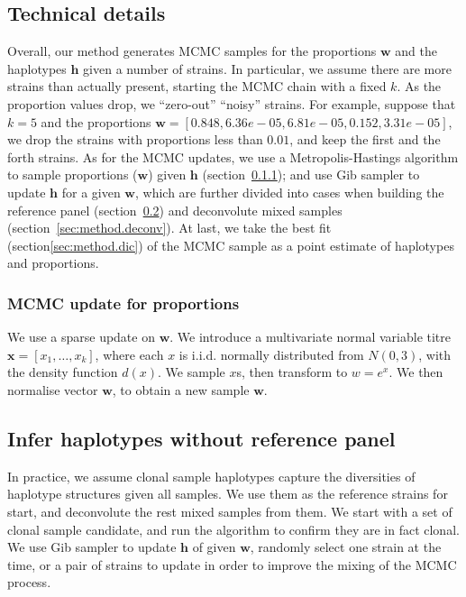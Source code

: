 \documentclass{bioinfo}
\begin{document}
\subsection{Technical details}
Overall, our method generates MCMC samples for the proportions $\mathbf w$ and the haplotypes $\mathbf h$ given a number of strains. In particular, we assume there are more strains than actually present, starting the MCMC chain with a fixed $k$. As the proportion values drop, we ``zero-out'' ``noisy'' strains. For example, suppose that $k=5$ and the proportions $\mathbf w= [0.848, 6.36e-05, 6.81e-05, 0.152, 3.31e-05]$, we drop the strains with proportions less than $0.01$, and keep the first and the forth strains. As for the MCMC updates, we use a Metropolis-Hastings algorithm to sample proportions ($\mathbf w$) given $\mathbf h$ (section~\ref{sec:updateP}); and use Gib sampler to update $\mathbf h$ for a given $\mathbf w$, which are further divided into cases when building the reference panel (section~\ref{sec:method.ref}) and deconvolute mixed samples (section~\ref{sec:method.deconv}). At last, we take the best fit (section\ref{sec:method.dic}) of the MCMC sample as a point estimate of haplotypes and proportions.

\subsubsection{MCMC update for proportions}\label{sec:updateP}
We use a sparse update on $\mathbf w$. We introduce a multivariate normal variable titre ${\mathbf x} = [x_1,\dots,x_k]$, where each $x$ is i.i.d. normally distributed from $N(0, 3)$, with the density function $d(x)$. We sample $x$s, then transform to $w = e^x$. We then normalise vector $\mathbf w$, to obtain a new sample ${\mathbf w}$.




\subsection{Infer haplotypes without reference panel}\label{sec:method.ref}
In practice, we assume clonal sample haplotypes capture the diversities of haplotype structures given all samples. We use them as the reference strains for start, and deconvolute the rest mixed samples from them. We start with a set of clonal sample candidate, and run the algorithm to confirm they are in fact clonal. We use Gib sampler to update $\mathbf h$ of given $\mathbf w$, randomly select one strain at the time, or a pair of strains to update in order to improve the mixing of the MCMC process.
\end{document}
